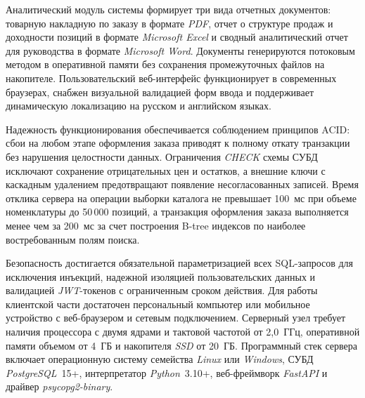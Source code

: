 Аналитический модуль системы формирует три вида отчетных документов: товарную накладную по заказу в формате \textit{PDF}, отчет о структуре продаж и доходности позиций в формате \textit{Microsoft Excel} и сводный аналитический отчет для руководства в формате \textit{Microsoft Word}. Документы генерируются потоковым методом в оперативной памяти без сохранения промежуточных файлов на накопителе. Пользовательский веб-интерфейс функционирует в современных браузерах, снабжен визуальной валидацией форм ввода и поддерживает динамическую локализацию на русском и английском языках.

Надежность функционирования обеспечивается соблюдением принципов ACID: сбои на любом этапе оформления заказа приводят к полному откату транзакции без нарушения целостности данных. Ограничения \textit{CHECK} схемы СУБД исключают сохранение отрицательных цен и остатков, а внешние ключи с каскадным удалением предотвращают появление несогласованных записей. Время отклика сервера на операции выборки каталога не превышает 100~мс при объеме номенклатуры до 50\,000 позиций, а транзакция оформления заказа выполняется менее чем за 200~мс за счет построения B-tree индексов по наиболее востребованным полям поиска.

Безопасность достигается обязательной параметризацией всех SQL-запросов для исключения инъекций, надежной изоляцией пользовательских данных и валидацией \textit{JWT}-токенов с ограниченным сроком действия. Для работы клиентской части достаточен персональный компьютер или мобильное устройство с веб-браузером и сетевым подключением. Серверный узел требует наличия процессора с двумя ядрами и тактовой частотой от 2,0~ГГц, оперативной памяти объемом от 4~ГБ и накопителя \textit{SSD} от 20~ГБ. Программный стек сервера включает операционную систему семейства \textit{Linux} или \textit{Windows}, СУБД \textit{PostgreSQL}~15+, интерпретатор \textit{Python}~3.10+, веб-фреймворк \textit{FastAPI} и драйвер \textit{psycopg2-binary}.
